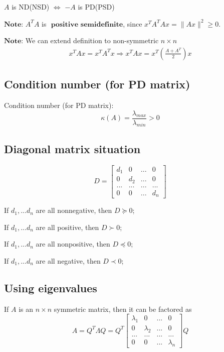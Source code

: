 \documentclass[11pt]{elegantbook}
\begin{document}
$A$ is ND(NSD) $\Leftrightarrow$ $-A$ is PD(PSD)

$\textbf{Note:}$ $A^TA$ is $\textbf{ positive semidefinite}$, since $x^TA^TAx=\|Ax\|^2\geq 0$.

$\textbf{Note:}$ We can extend definition to non-symmetric $n\times n$
\begin{equation}
    \begin{aligned}
        x^TAx=x^TA^Tx \Rightarrow x^TAx=x^T(\frac{A+A^T}{2})x
    \end{aligned}
    \nonumber
\end{equation}

\subsection{Condition number (for PD matrix)}
Condition number (for PD matrix):$$\kappa (A)=\frac{\lambda_{max}}{\lambda_{min}}>0$$











\subsection{Diagonal matrix situation}
$$D=\begin{bmatrix}
    d_1&0&... &0\\0&d_2&...&0\\...&...&...&...\\0&0&...&d_n
\end{bmatrix}$$
\begin{lemma}
    If $d_1,...d_n$ are all nonnegative, then $D\succeq 0$;

    If $d_1,...d_n$ are all positive, then $D\succ 0$;
    
    If $d_1,...d_n$ are all nonpositive, then $D\preceq 0$;
    
    If $d_1,...d_n$ are all negative, then $D\prec 0$;
\end{lemma}

\subsection{Using eigenvalues}
If $A$ is an $n \times n$ symmetric matrix, then it can be factored as
    $$A=Q^T\Lambda Q=Q^T
    \begin{bmatrix}
        \lambda_1&0&... &0\\
        0&\lambda_2&...&0\\
       ...&...&...&...\\
        0&0&...&\lambda_n
    \end{bmatrix}Q$$
\end{document}

